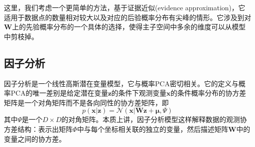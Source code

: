 这里，我们考虑一个更简单的方法，基于证据近似(evidence approximation)，它适用于数据点的数量相对较大以及对应的后验概率分布有尖峰的情形。它涉及到对$\boldsymbol{W}$上的先验概率分布的一个具体的选择，使得主子空间中多余的维度可以从模型中剪枝掉。
\subsection*{因子分析}
因子分析是一个线性高斯潜在变量模型，它与概率PCA密切相关。它的定义与概率PCA的唯一差别是给定潜在变量$\boldsymbol{z}$的条件下观测变量$\boldsymbol{x}$的条件概率分布的协方差矩阵是一个对角矩阵而不是各向同性的协方差矩阵，即
\begin{equation}
	p(\boldsymbol{x}|\boldsymbol{z})=\mathcal{N}(\boldsymbol{x}|\boldsymbol{Wz}+\boldsymbol{\mu},\Psi)
\end{equation} 
其中$\Psi$是一个$D\times D$的对角矩阵。本质上讲，因子分析模型这样解释数据的观测协方差结构：表示出矩阵$\Phi$中与每个坐标相关联的独立的变量，然后描述矩阵$\boldsymbol{W}$中的变量之间的协方差。 
